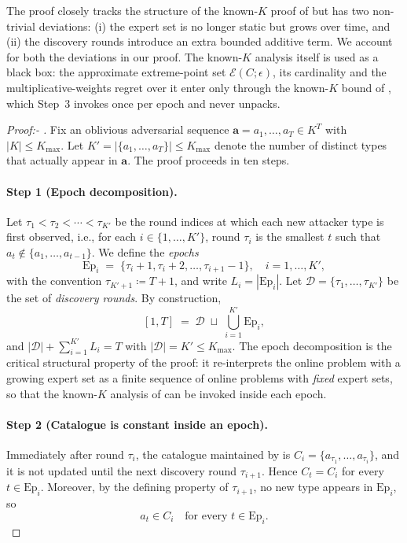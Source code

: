 \documentclass[letterpaper,9pt,twocolumn]{extarticle}
\newcommand{\avec}{\mathbf{a}}
\newcommand{\cE}{\mathcal{E}}
\newcommand{\Kmax}{K_{\max}}
\theoremstyle{plain}
\theoremstyle{definition}
\theoremstyle{remark}
\begin{document}
The proof closely tracks the structure of the known-$K$ proof of \citet[Sec.~5]{balcan2015}
but has two non-trivial deviations: (i) the expert set is no longer static
but grows over time, and (ii) the discovery rounds introduce an extra
bounded additive term. We account for both the deviations in our proof.
The known-$K$ analysis itself is used as a black box: the approximate
extreme-point set $\cE(C;\epsilon)$, its cardinality and the
multiplicative-weights regret over it enter only through the known-$K$
bound of \citet[Theorem 5.1]{balcan2015}, which Step~3 invokes once per
epoch and never unpacks.

\begin{proof}[Proof:- ]
Fix an oblivious adversarial sequence $\avec=a_1,\dots,a_T\in K^T$ with
$|K|\le\Kmax$. Let $K'=|\{a_1,\dots,a_T\}|\le\Kmax$ denote the number of
distinct types that actually appear in $\avec$. The proof proceeds in ten
steps.

\paragraph{Step 1 (Epoch decomposition).}
Let $\tau_1<\tau_2<\cdots<\tau_{K'}$ be the round indices at which each
new attacker type is first observed, i.e., for each
$i\in\{1,\dots,K'\}$, round $\tau_i$ is the smallest $t$ such that
$a_t\notin\{a_1,\dots,a_{t-1}\}$. We define the \emph{epochs}
\begin{equation}
\mathrm{Ep}_i\;=\;\{\tau_i+1,\tau_i+2,\dots,\tau_{i+1}-1\},\quad
i=1,\dots,K',
\label{eq:epoch-def}
\end{equation}
with the convention $\tau_{K'+1}\coloneqq T+1$, and write
$L_i=|\mathrm{Ep}_i|$. Let
$\mathcal{D}=\{\tau_1,\dots,\tau_{K'}\}$ be the set of \emph{discovery
rounds}. By construction,
\[
[1,T]\;=\;\mathcal{D}\;\sqcup\;\bigcup_{i=1}^{K'}\mathrm{Ep}_i,
\]
and
$|\mathcal{D}|+\sum_{i=1}^{K'}L_i=T$ with $|\mathcal{D}|=K'\le\Kmax$. The
epoch decomposition is the critical structural property of the proof: it
re-interprets the online problem with a growing expert set as a finite
sequence of online problems with \emph{fixed} expert sets, so that the
known-$K$ analysis of \citet{balcan2015} can be invoked inside each
epoch.

\paragraph{Step 2 (Catalogue is constant inside an epoch).}
Immediately after round $\tau_i$, the catalogue maintained by
 is $C_i=\{a_{\tau_1},\dots,a_{\tau_i}\}$, and it is not
updated until the next discovery round $\tau_{i+1}$. Hence $C_t=C_i$ for
every $t\in\mathrm{Ep}_i$. Moreover, by the defining property of
$\tau_{i+1}$, no new type appears in $\mathrm{Ep}_i$, so
\begin{equation}
a_t\in C_i\quad\text{for every }t\in\mathrm{Ep}_i.
\label{eq:epoch-types}
\end{equation}


\end{proof}
\end{document}
